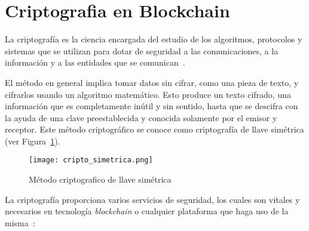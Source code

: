 
\section {Criptografia en Blockchain}  %


La criptografía es la ciencia encargada del estudio de los algoritmos, protocolos y sistemas que se utilizan para dotar de seguridad a las comunicaciones, a la información y a las entidades que se comunican~\cite{pastor1998criptografia}.

El método en general implica tomar datos sin cifrar, como una pieza de texto, y cifrarlos usando un algoritmo matemático. Esto produce un texto cifrado, una información que es completamente inútil y sin sentido, hasta que se descifra con la ayuda de una clave preestablecida y conocida solamente por el emisor y receptor. Este método  criptográfico se conoce como criptografía de llave simétrica (ver Figura~\ref{blockcain_llavesimetrica}).

\begin{figure}[h]
    \centering
    \texttt{[image: cripto\_simetrica.png]}
     \caption{Método criptografico de llave simétrica} 
    \label{blockcain_llavesimetrica}
\end{figure}

La criptografía proporciona varios servicios de seguridad, los cuales son vitales y necesarios en tecnología \textit{blockchain} o cualquier plataforma que haga uso de la misma~\cite{bashir2017mastering}:

